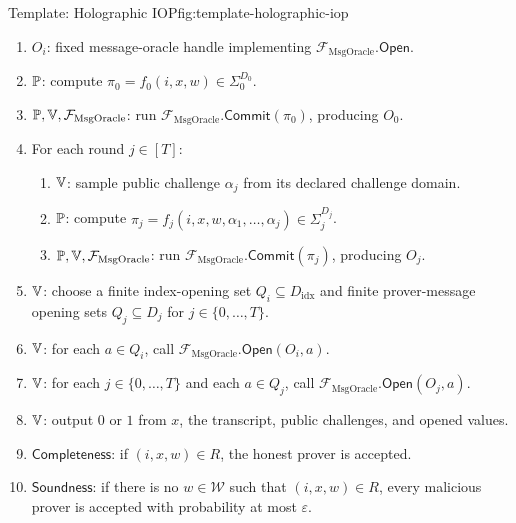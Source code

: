 \begin{protocolbox}{Template: Holographic IOP}{fig:template-holographic-iop}
\smallskip
\begin{enumerate}[leftmargin=0.24in,label=\textbf{G\arabic*.},itemsep=0.08em,topsep=0.1em,parsep=0pt]
  \item \(O_i\): fixed message-oracle handle implementing
        \(\mathcal F_{\mathrm{MsgOracle}}.\mathsf{Open}\).
  \item \(\mathbb{P}\): compute
        \(\pi_0=f_0(i,x,w)\in\Sigma_0^{D_0}\).
  \item \(\mathbb{P},\mathbb{V},\mathcal F_{\mathrm{MsgOracle}}\): run
        \(\mathcal F_{\mathrm{MsgOracle}}.\mathsf{Commit}(\pi_0)\),
        producing \(O_0\).
  \item For each round \(j\in[T]\):
        \begin{enumerate}[leftmargin=0.2in,label=\textbf{G\arabic{enumi}.\arabic*.},itemsep=0.05em,topsep=0.05em,parsep=0pt]
          \item \(\mathbb{V}\): sample public challenge \(\alpha_j\) from its
                declared challenge domain.
          \item \(\mathbb{P}\): compute
                \(\pi_j=f_j(i,x,w,\alpha_1,\ldots,\alpha_j)\in\Sigma_j^{D_j}\).
          \item \(\mathbb{P},\mathbb{V},\mathcal F_{\mathrm{MsgOracle}}\): run
                \(\mathcal F_{\mathrm{MsgOracle}}.\mathsf{Commit}(\pi_j)\),
                producing \(O_j\).
        \end{enumerate}
  \item \(\mathbb{V}\): choose a finite index-opening set
        \(Q_i\subseteq D_{\mathrm{idx}}\) and finite prover-message opening sets
        \(Q_j\subseteq D_j\) for \(j\in\{0,\ldots,T\}\).
  \item \(\mathbb{V}\): for each \(a\in Q_i\), call
        \(\mathcal F_{\mathrm{MsgOracle}}.\mathsf{Open}(O_i,a)\).
  \item \(\mathbb{V}\): for each \(j\in\{0,\ldots,T\}\) and each
        \(a\in Q_j\), call
        \(\mathcal F_{\mathrm{MsgOracle}}.\mathsf{Open}(O_j,a)\).
  \item \(\mathbb{V}\): output \(0\) or \(1\) from \(x\), the transcript,
        public challenges, and opened values.
  \item \(\mathsf{Completeness}\): if \((i,x,w)\in R\), the honest prover is
        accepted.
  \item \(\mathsf{Soundness}\): if there is no \(w\in\mathcal W\) such that
        \((i,x,w)\in R\), every malicious prover is accepted with probability
        at most \(\varepsilon\).
\end{enumerate}
\end{protocolbox}

